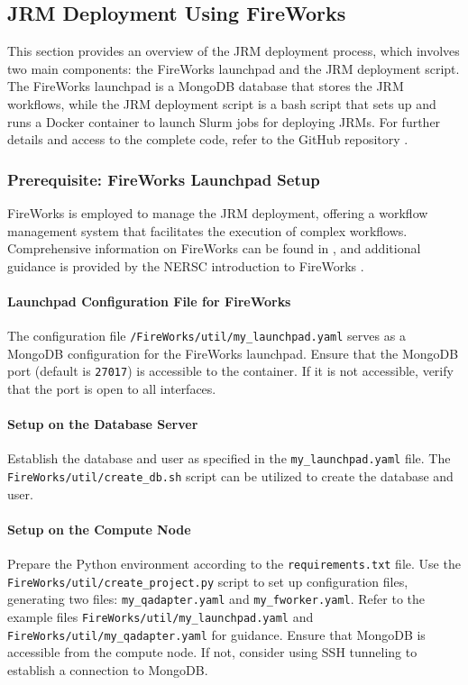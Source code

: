 \subsection{JRM Deployment Using FireWorks}
\label{jrm-deployment}

This section provides an overview of the JRM deployment process, which involves two main components: the FireWorks launchpad and the JRM deployment script. The FireWorks launchpad is a MongoDB database that stores the JRM workflows, while the JRM deployment script is a bash script that sets up and runs a Docker container to launch Slurm jobs for deploying JRMs. For further details and access to the complete code, refer to the GitHub repository \cite{github}.

\subsubsection{Prerequisite: FireWorks Launchpad Setup}

FireWorks is employed to manage the JRM deployment, offering a workflow management system that facilitates the execution of complex workflows. Comprehensive information on FireWorks can be found in \cite{fireworks-url}, and additional guidance is provided by the NERSC introduction to FireWorks \cite{nersc-url}.

\paragraph{Launchpad Configuration File for FireWorks}
The configuration file \texttt{/FireWorks/util/my\_launchpad.yaml} serves as a MongoDB configuration for the FireWorks launchpad. Ensure that the MongoDB port (default is \texttt{27017}) is accessible to the container. If it is not accessible, verify that the port is open to all interfaces.

\paragraph{Setup on the Database Server}
Establish the database and user as specified in the \texttt{my\_launchpad.yaml} file. The \texttt{FireWorks/util/create\_db.sh} script can be utilized to create the database and user.

\paragraph{Setup on the Compute Node}
Prepare the Python environment according to the \texttt{requirements.txt} file. Use the \texttt{FireWorks/util/create\_project.py} script to set up configuration files, generating two files: \texttt{my\_qadapter.yaml} and \texttt{my\_fworker.yaml}. Refer to the example files \texttt{FireWorks/util/my\_launchpad.yaml} and \texttt{FireWorks/util/my\_qadapter.yaml} for guidance. Ensure that MongoDB is accessible from the compute node. If not, consider using SSH tunneling to establish a connection to MongoDB.

